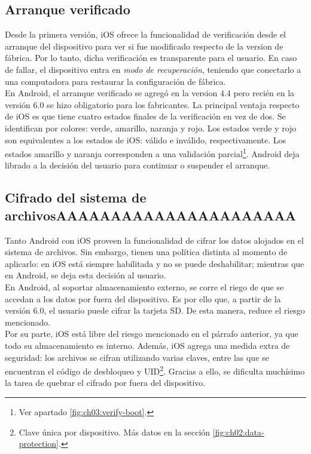 \subsection{Arranque verificado}
Desde la primera versión, iOS ofrece la funcionalidad de verificación desde el arranque del dispositivo para ver si fue modificado respecto de la version de fábrica. Por lo tanto, dicha verificación es transparente para el usuario. En caso de fallar, el dispositivo entra en \emph{modo de recuperación}, teniendo que conectarlo a una computadora para restaurar la configuración de fábrica.\\
En Android, el arranque verificado se agregó en la version 4.4 pero recién en la versión 6.0 se hizo obligatorio para los fabricantes. La principal ventaja respecto de iOS es que tiene cuatro estados finales de la verificación en vez de dos. Se identifican por colores: verde, amarillo, naranja y rojo. Los estados verde y rojo son equivalentes a los estados de iOS: válido e inválido, respectivamente. Los estados amarillo y naranja corresponden a una validación parcial\footnote{Ver apartado \ref{fig:ch03:verify-boot}.}. Android deja librado a la decisión del usuario para continuar o suspender el arranque.
\subsection{Cifrado del sistema de archivosAAAAAAAAAAAAAAAAAAAAAA}
Tanto Android con iOS proveen la funcionalidad de cifrar los datos alojados en el sistema de archivos. Sin embargo, tienen una política distinta al momento de aplicarlo: en iOS está siempre habilitada y no se puede deshabilitar; mientras que en Android, se deja esta decisión al usuario.\\
En Android, al soportar almacenamiento externo, se corre el riego de que se accedan a los datos por fuera del dispositivo. Es por ello que, a partir de la versión 6.0, el usuario puede cifrar la tarjeta SD. De esta manera, reduce el riesgo mencionado.\\
Por su parte, iOS está libre del riesgo mencionado en el párrafo anterior, ya que todo su almacenamiento es interno. Además, iOS agrega una medida extra de seguridad: los archivos se cifran utilizando varias claves, entre las que se encuentran el código de desbloqueo y UID\footnote{Clave única por dispositivo. Más datos en la sección \ref{fig:ch02:data-protection}.}. Gracias a ello, se dificulta muchísimo la tarea de quebrar el cifrado por fuera del dispositivo.
